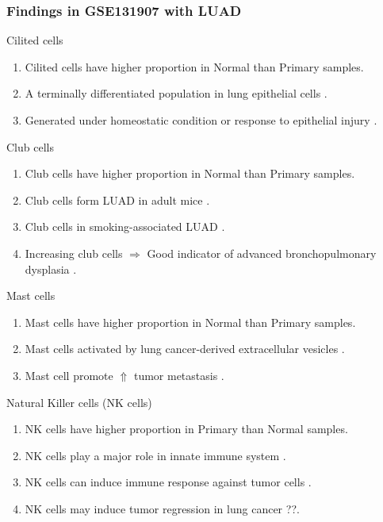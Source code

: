 \documentclass{beamer}
\begin{document}
    \begin{frame}[allowframebreaks]
        \frametitle{Findings in GSE131907 with LUAD}

        \begin{block}{Cilited cells}
            \begin{enumerate}
                \item Cilited cells have higher proportion in Normal than Primary samples.
                \item A terminally differentiated population in lung epithelial cells \cite{ciliated-1}.
                \item Generated under homeostatic condition or response to epithelial injury \cite{ciliated-2}.
            \end{enumerate}
        \end{block}

        \begin{block}{Club cells}
            \begin{enumerate}
                \item Club cells have higher proportion in Normal than Primary samples.
                \item Club cells form LUAD in adult mice \cite{club-1}.
                \item Club cells in smoking-associated LUAD \cite{club-2}.
                \item Increasing club cells $\Rightarrow$ Good indicator of advanced bronchopulmonary dysplasia \cite{club-3}.
            \end{enumerate}
        \end{block}

        \begin{block}{Mast cells}
            \begin{enumerate}
                \item Mast cells have higher proportion in Normal than Primary samples.
                \item Mast cells activated by lung cancer-derived extracellular vesicles \cite{mast-1}.
                \item Mast cell promote $\Uparrow$ tumor metastasis \cite{mast-2}.
            \end{enumerate}
        \end{block}

        \begin{block}{Natural Killer cells (NK cells)}
            \begin{enumerate}
                \item NK cells have higher proportion in Primary than Normal samples.
                \item NK cells play a major role in innate immune system \cite{NK-2}.
                \item NK cells can induce immune response against tumor cells \cite{NK-2}.
                \item NK cells may induce tumor regression in lung cancer \cite{NK-1} ??.
            \end{enumerate}
        \end{block}


\end{frame}
\end{document}
